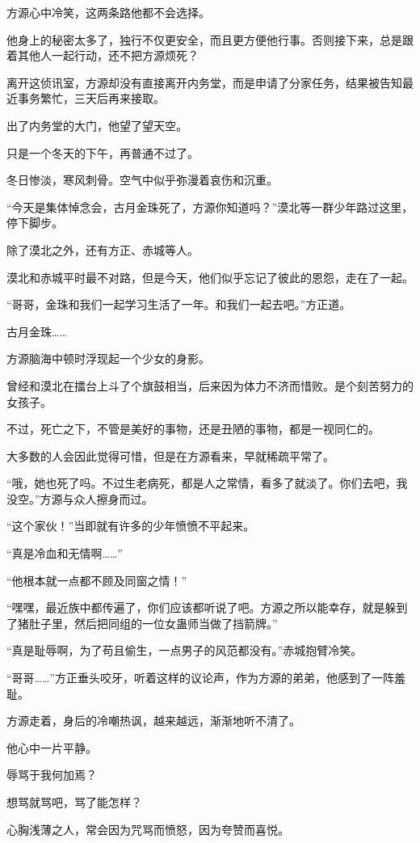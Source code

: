 \begin{this_body}
方源心中冷笑，这两条路他都不会选择。

他身上的秘密太多了，独行不仅更安全，而且更方便他行事。否则接下来，总是跟着其他人一起行动，还不把方源烦死？

离开这侦讯室，方源却没有直接离开内务堂，而是申请了分家任务，结果被告知最近事务繁忙，三天后再来接取。

出了内务堂的大门，他望了望天空。

只是一个冬天的下午，再普通不过了。

冬日惨淡，寒风刺骨。空气中似乎弥漫着哀伤和沉重。

“今天是集体悼念会，古月金珠死了，方源你知道吗？”漠北等一群少年路过这里，停下脚步。

除了漠北之外，还有方正、赤城等人。

漠北和赤城平时最不对路，但是今天，他们似乎忘记了彼此的恩怨，走在了一起。

“哥哥，金珠和我们一起学习生活了一年。和我们一起去吧。”方正道。

古月金珠……

方源脑海中顿时浮现起一个少女的身影。

曾经和漠北在擂台上斗了个旗鼓相当，后来因为体力不济而惜败。是个刻苦努力的女孩子。

不过，死亡之下，不管是美好的事物，还是丑陋的事物，都是一视同仁的。

大多数的人会因此觉得可惜，但是在方源看来，早就稀疏平常了。

“哦，她也死了吗。不过生老病死，都是人之常情，看多了就淡了。你们去吧，我没空。”方源与众人擦身而过。

“这个家伙！”当即就有许多的少年愤愤不平起来。

“真是冷血和无情啊……”

“他根本就一点都不顾及同窗之情！”

“嘿嘿，最近族中都传遍了，你们应该都听说了吧。方源之所以能幸存，就是躲到了猪肚子里，然后把同组的一位女蛊师当做了挡箭牌。”

“真是耻辱啊，为了苟且偷生，一点男子的风范都没有。”赤城抱臂冷笑。

“哥哥……”方正垂头咬牙，听着这样的议论声，作为方源的弟弟，他感到了一阵羞耻。

方源走着，身后的冷嘲热讽，越来越远，渐渐地听不清了。

他心中一片平静。

辱骂于我何加焉？

想骂就骂吧，骂了能怎样？

心胸浅薄之人，常会因为咒骂而愤怒，因为夸赞而喜悦。


\end{this_body}
